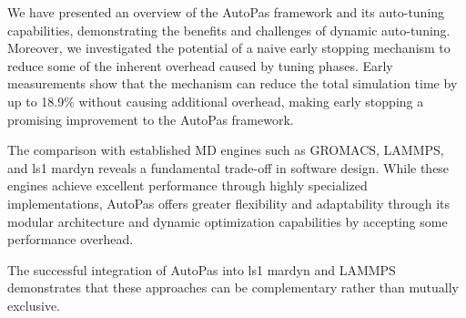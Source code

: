 \documentclass[conference]{IEEEtran}
\begin{document}
We have presented an overview of the AutoPas framework and its auto-tuning capabilities, demonstrating the benefits and challenges of dynamic auto-tuning. Moreover, we investigated the potential of a naive early stopping mechanism to reduce some of the inherent overhead caused by tuning phases.
Early measurements show that the mechanism can reduce the total simulation time by up to 18.9\% without causing additional overhead, making early stopping a promising improvement to the AutoPas framework.

The comparison with established MD engines such as GROMACS, LAMMPS, and ls1 mardyn reveals a fundamental trade-off in software design. While these engines achieve excellent performance through highly specialized implementations, AutoPas offers greater flexibility and adaptability through its modular architecture and dynamic optimization capabilities by accepting some performance overhead.

The successful integration of AutoPas into ls1 mardyn and LAMMPS demonstrates that these approaches can be complementary rather than mutually exclusive.

\newpage



\end{document}
